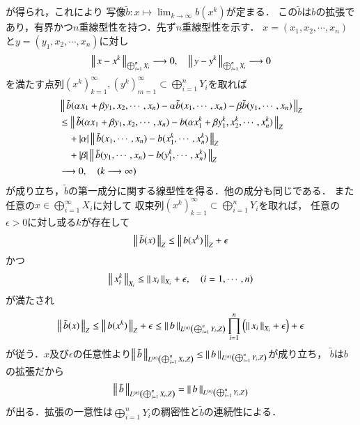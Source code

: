 \begin{prf}
		が得られ，これにより
		写像$\tilde{b}:x \longmapsto \lim_{k \to \infty} b(x^k)$が定まる．
		この$\tilde{b}$は$b$の拡張であり，有界かつ$n$重線型性を持つ．先ず$n$重線型性を示す．
		$x = (x_1,x_2,\cdots,x_n)$と$y = (y_1,x_2,\cdots,x_n)$に対し
		\begin{align}
			\Norm{x - x^k}{\bigoplus_{i=1}^n X_i} 
			\longrightarrow 0,
			\quad \Norm{y - y^k}{\bigoplus_{i=1}^n X_i} 
			\longrightarrow 0
		\end{align}
		を満たす点列$(x^k)_{k=1}^\infty,(y^k)_{m=1}^\infty \subset \bigoplus_{i=1}^n Y_i$を取れば
		\begin{align}
			&\Norm{\tilde{b}(\alpha x_1 + \beta y_1,x_2,\cdots,x_n) 
				- \alpha \tilde{b}(x_1,\cdots,x_n)
				- \beta \tilde{b}(y_1,\cdots,x_n)}{Z} \\
			&\leq \Norm{\tilde{b}(\alpha x_1 + \beta y_1,x_2,\cdots,x_n)
				- b(\alpha x^k_1 + \beta y^k_1,x^k_2,\cdots,x^k_n)}{Z} \\
				&\quad + |\alpha| \Norm{\tilde{b}(x_1,\cdots,x_n)
				- b(x^k_1,\cdots,x^k_n)}{Z} \\
				&\quad + |\beta| \Norm{\tilde{b}(y_1,\cdots,x_n)
				- b(y^k_1,\cdots,x^k_n)}{Z} \\
			&\longrightarrow 0,
			\quad (k \longrightarrow \infty)
		\end{align}
		が成り立ち，$\tilde{b}$の第一成分に関する線型性を得る．他の成分も同じである．
		また任意の$x \in \bigoplus_{i=1}^\infty X_i$に対して
		収束列$(x^k)_{k=1}^\infty \subset \bigoplus_{i=1}^n Y_i$を取れば，
		任意の$\epsilon > 0$に対し或る$k$が存在して
		\begin{align}
			\Norm{\tilde{b}(x)}{Z} \leq \Norm{b(x^k)}{Z} + \epsilon
		\end{align}
		かつ
		\begin{align}
			\Norm{x^k_i}{X_i} \leq \Norm{x_i}{X_i} + \epsilon,
			\quad (i=1,\cdots,n)
		\end{align}
		が満たされ
		\begin{align}
			\Norm{\tilde{b}(x)}{Z} \leq \Norm{b(x^k)}{Z} + \epsilon
			\leq \Norm{b}{\ContLn{\bigoplus_{i=1}^n Y_i}{Z}{n}} \prod_{i=1}^n \left( \Norm{x_i}{X_i} + \epsilon \right) + \epsilon
		\end{align}
		が従う．$x$及び$\epsilon$の任意性より$\Norm{\tilde{b}}{\ContLn{\bigoplus_{i=1}^n X_i}{Z}{n}}
		\leq \Norm{b}{\ContLn{\bigoplus_{i=1}^n Y_i}{Z}{n}}$が成り立ち，
		$\tilde{b}$は$b$の拡張だから
		\begin{align}
			\Norm{\tilde{b}}{\ContLn{\bigoplus_{i=1}^n X_i}{Z}{n}}
			= \Norm{b}{\ContLn{\bigoplus_{i=1}^n Y_i}{Z}{n}}
		\end{align}
		が出る．拡張の一意性は$\bigoplus_{i=1}^n Y_i$の稠密性と$\tilde{b}$の連続性による．
		\QED
	\end{prf}